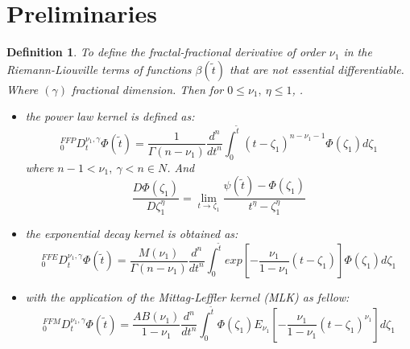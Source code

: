 \documentclass[10pt,a4paper]{amsart}
\newtheorem{definition}{Definition}[section]
\numberwithin{equation}{section}
\begin{document}
\section{Preliminaries}\label{sec3}
\begin{definition}\label{def2-1}
To define the fractal-fractional derivative of order $\nu_1$ in the Riemann-Liouville terms of functions $\beta(\tilde{t})$ that are not essential differentiable. Where $(\gamma)$ fractional dimension.
Then for $0 \leq
\nu_1,~ \eta \leq 1$, .
\begin{itemize}
    \item the power law kernel is defined as:
\begin{equation}\label{eq2-1}
    _0^{FFP}D_t^{\nu_1, \gamma}  \Phi (\tilde{t}) = \frac{1}{\Gamma (n-\nu_1)} \frac{d^n}{dt^n} \int_0^{\tilde{t}} (t-\zeta_1)^{n-\nu_1-1} \Phi (\zeta_1) d\zeta_1
\end{equation}
where $n-1 < \nu_1,~ \gamma <n \in N$. And 
\begin{equation}\label{eq2-2}
\frac{D \Phi(\zeta_1)}{D \zeta_1^{\eta}} = \lim_{t \rightarrow \zeta_1} \frac{\psi(\tilde{t}) - \Phi(\zeta_1)}{ t^{\eta} - \zeta_1^{\eta}}   
\end{equation}
\item the exponential decay kernel is obtained as:
\begin{equation}\label{eq2-3}
    _0^{FFE}D_t^{\nu_1, \gamma}  \Phi (\tilde{t}) = \frac{M (\nu_1)}{\Gamma (n-\nu_1)} \frac{d^n}{dt^n} \int_0^{\tilde{t}} exp [- \frac{\nu_1}{1-\nu_1}(t-\zeta_1)] \Phi (\zeta_1) d\zeta_1    
\end{equation}

\item with the application of the Mittag-Leffler kernel (MLK) as fellow:
\begin{equation}\label{eq2-4}
    _0^{FFM}D_t^{\nu_1, \gamma}  \Phi (\tilde{t}) = \frac{AB (\nu_1)}{1-\nu_1 } \frac{d^n}{dt^n} \int_0^{\tilde{t}} \Phi (\zeta_1) E_{\nu_1} [- \frac{\nu_1}{1-\nu_1}(t-\zeta_1)^{\nu_1}]  d\zeta_1    
\end{equation}
\end{itemize}
\end{definition}
\end{document}
